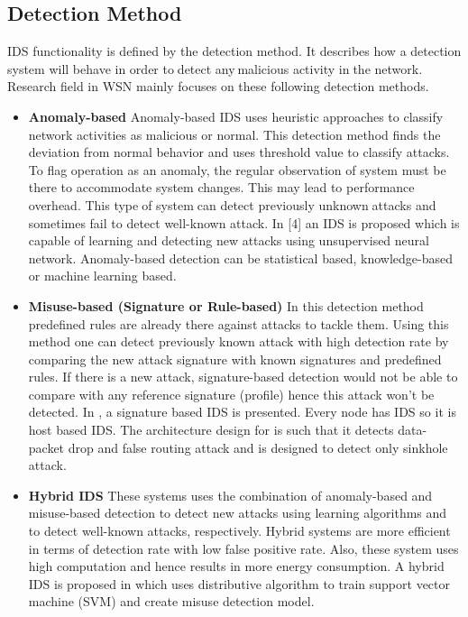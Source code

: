 \subsection{Detection Method}
IDS functionality is defined by the detection method. It describes how a detection system will behave in order to\textcolor{white}{.}detect any\textcolor{white}{.}malicious activity in\textcolor{white}{.}the network. Research field in WSN mainly focuses on these following detection methods.
\begin{itemize}
  \item{\textbf{Anomaly-based} Anomaly-based IDS uses heuristic approaches to classify network activities as malicious or normal. This detection method finds the deviation from normal behavior and uses threshold value to classify attacks. To flag operation as an anomaly, the regular observation of system must be there to accommodate system changes. This may lead to performance overhead. This type\textcolor{white}{.}of system\textcolor{white}{.}can detect previously unknown\textcolor{white}{.}attacks and sometimes fail to detect well-known attack. In [4] an IDS is proposed which is capable of learning and detecting new attacks using unsupervised neural network. Anomaly-based detection can be statistical based, knowledge-based or machine learning based.}
  \item{\textbf{Misuse-based (Signature or Rule-based)} In this detection method predefined rules are already there against attacks to tackle them. Using this method one can detect previously known attack with high detection rate by comparing the new attack signature with known signatures and predefined rules. If there is a new attack, signature-based detection would not be able to compare with any reference signature (profile) hence this attack won’t be detected. In \cite{ioannis2007towards, krontiris2007intrusion}, a signature based IDS is presented. Every node has IDS so it is host based IDS. The architecture design for \cite{ioannis2007towards} is such that it detects data-packet drop and false routing attack and \cite{krontiris2007intrusion} is designed to detect only sinkhole attack.}
  \item{\textbf{Hybrid IDS} These systems uses the combination of anomaly-based and misuse-based detection to detect new attacks using learning algorithms and  to detect well-known attacks, respectively. Hybrid systems are more efficient in terms of detection rate with low false positive rate. Also, these system uses high computation and hence results in more energy consumption. A hybrid IDS is proposed in \cite{li2008intruder} which uses distributive algorithm to train support vector machine (SVM) and create misuse detection model.}
\end{itemize}
